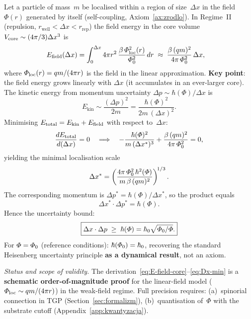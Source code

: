 \begin{proposition}%
\label{prop:uncertainty-tgp}
Let a particle of mass~$m$ be localised within a region of
size~$\Delta x$ in the field $\Phi(r)$ generated by itself
(self-coupling, Axiom~\ref{ax:zrodlo}).  In Regime~II (repulsion,
$r_{\mathrm{well}} < \Delta x < r_{\mathrm{rep}}$) the field energy
in the core volume $V_{\rm core} \sim (4\pi/3)\Delta x^3$ is
\begin{align}\label{eq:E-field-core}
  E_{\rm field}(\Delta x)
  &= \int_0^{\Delta x} 4\pi r^2\,
     \frac{\beta\,\Phi_{\rm loc}^2(r)}{\PhiZero^2}\,dr
  \;\approx\;
  \frac{\beta\,(qm)^2}{4\pi\,\PhiZero^2}\,\Delta x,
\end{align}
where $\Phi_{\rm loc}(r) = qm/(4\pi r)$ is the field in the linear
approximation.
\textbf{Key point}: the field energy grows linearly with $\Delta x$
(it accumulates in an ever-larger core).  The kinetic energy from
momentum uncertainty $\Delta p \sim \hbar(\Phi)/\Delta x$ is
\begin{equation}\label{eq:E-kin-uncertainty}
  E_{\mathrm{kin}} \sim \frac{(\Delta p)^2}{2m}
  = \frac{\hbar(\Phi)^2}{2m\,(\Delta x)^2}.
\end{equation}
Minimising
$E_{\mathrm{total}} = E_{\mathrm{kin}} + E_{\rm field}$ with
respect to~$\Delta x$:
\begin{equation}\label{eq:Emin-condition}
  \frac{dE_{\rm total}}{d(\Delta x)} = 0
  \quad\Longrightarrow\quad
  -\frac{\hbar(\Phi)^2}{m\,(\Delta x^*)^3}
  + \frac{\beta\,(qm)^2}{4\pi\,\PhiZero^2} = 0,
\end{equation}
yielding the minimal localisation scale
\begin{equation}\label{eq:Dx-min}
  \Delta x^* = \left(
    \frac{4\pi\,\PhiZero^2\,\hbar^2(\Phi)}
         {m\,\beta\,(qm)^2}
  \right)^{\!1/3}.
\end{equation}
The corresponding momentum is
$\Delta p^* = \hbar(\Phi)/\Delta x^*$, so the product equals
\begin{equation}\label{eq:uncertainty-tgp-full}
  \Delta x^*\cdot\Delta p^* = \hbar(\Phi).
\end{equation}
Hence the uncertainty bound:
\begin{equation}\label{eq:HUP-TGP}
  \boxed{\Delta x \cdot \Delta p
  \;\geq\; \hbar(\Phi)
  = \hbar_0\sqrt{\PhiZero/\Phi}.}
\end{equation}
For $\Phi = \PhiZero$ (reference conditions):
$\hbar(\PhiZero) = \hbar_0$, recovering the standard Heisenberg
uncertainty principle \textbf{as a dynamical result}, not an axiom.

\medskip\noindent\emph{Status and scope of validity.}\;
The derivation~\eqref{eq:E-field-core}--\eqref{eq:Dx-min} is a
\textbf{schematic order-of-magnitude proof} for the linear-field
model ($\Phi_{\rm loc} \sim qm/(4\pi r)$) in the weak-field regime.
Full precision requires: (a)~spinorial connection in TGP
(Section~\ref{sec:formalizm}), (b)~quantisation of~$\Phi$ with the
substrate cutoff (Appendix~\ref{app:kwantyzacja}).
\end{proposition}

